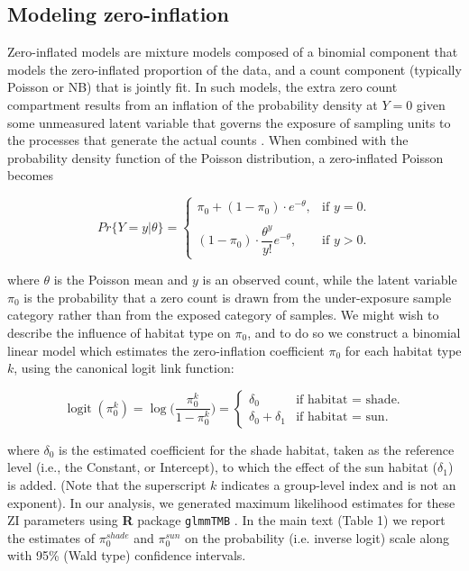 \documentclass[11pt, oneside]{amsart}
\DeclareMathOperator{\logit}{logit}
\newcommand{\lib}[1]{\texttt{#1}}
\begin{document}
\subsection{Modeling zero-inflation}

Zero-inflated models are mixture models composed of a binomial component that models the zero-inflated proportion of the data, and a count component (typically Poisson or NB) that is jointly fit. In such models, the extra zero count compartment results from an inflation of the probability density at $Y=0$ given some unmeasured latent variable that governs the exposure of sampling units to the processes that generate the actual counts \cite{Zuur09a}. When combined with the probability density function of the Poisson distribution, a zero-inflated Poisson becomes

\begin{equation}
Pr\Big \{Y = y | \theta \Big \} = \begin{cases}
	\pi_{0} + (1 - \pi_{0}) \cdot e^{-\theta}, & \text{if } y = 0.\\
	\\
    (1-\pi_{0}) \cdot \dfrac{\theta^{y}}{y!}e^{-\theta}, & \text{if } y > 0.
	\end{cases}
\end{equation}

where $\theta$ is the Poisson mean and $y$ is an observed count, while the latent variable $\pi_0$ is the probability that a zero count is drawn from the under-exposure sample category rather than from the exposed category of samples. We might wish to describe the influence of habitat type on $\pi_{0}$, and to do so we construct a binomial linear model which estimates the zero-inflation coefficient $\pi_0$ for each habitat type $k$, using the canonical logit link function:

\begin{equation}
  \logit (\pi_{0}^{k}) = \log \Bigg ( \frac{\pi_{0}^{k}}{1 - \pi_{0}^{k}} \Bigg ) = \begin{cases}
    \delta_0 & \text{if habitat = shade}.\\
    \delta_0 + \delta_1 & \text{if habitat = sun}.
  \end{cases}
\end{equation}

where $\delta_0$ is the estimated coefficient for the shade habitat, taken as the reference level (i.e., the Constant, or Intercept), to which the effect of the sun habitat ($\delta_1$) is added. (Note that the superscript $k$ indicates a group-level index and is not an exponent). In our analysis, we generated maximum likelihood estimates for these ZI parameters using \textbf{R} \cite{R-Core-Team17a} package \lib{glmmTMB} \cite{Jackman15a,Zeileis08a,Loeys12a}. In the main text (Table 1) we report the estimates of $\pi_{0}^{shade}$ and $\pi_{0}^{sun}$ on the probability (i.e. inverse logit) scale along with 95\% (Wald type) confidence intervals.
\end{document}
